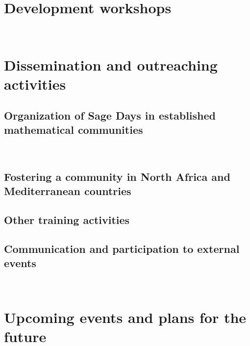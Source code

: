 \documentclass{../../Proposal/LaTeX-proposal/deliverablereport}
\author{Viviane Pons}
\begin{document}
\maketitle
\githubissuedescription

\section{Development workshops}
~


\vspace{0.5cm}


\section{Dissemination and outreaching activities}

\subsection{Organization of Sage Days in established mathematical communities}
~


\vspace{0.5cm}


\subsection{Fostering a community in North Africa and Mediterranean countries}

\subsection{Other training activities}

\subsection{Communication and participation to external events}
~


\vspace{0.5cm}


\vspace{0.5cm}


\vspace{0.5cm}



\section{Upcoming events and plans for the future}
\end{document}
